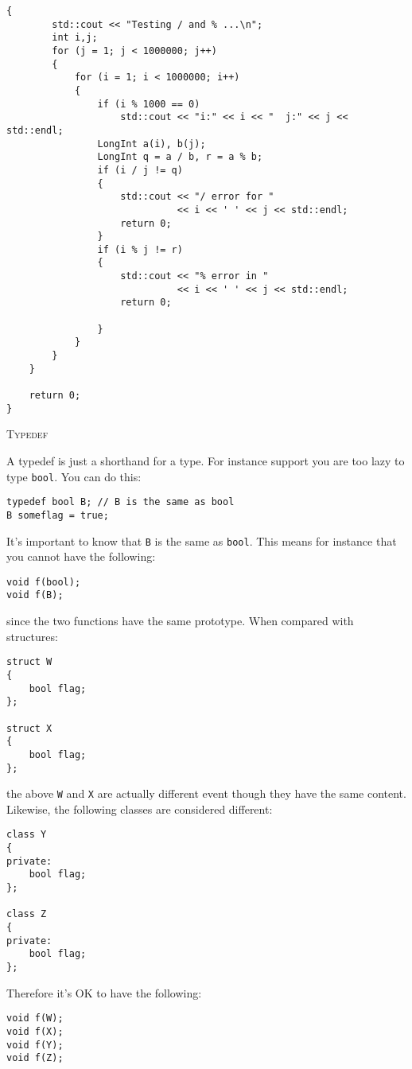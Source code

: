 \begin{Verbatim}[commandchars=\^\@\~, frame=single, fontsize=\footnotesize]
    {
        std::cout << "Testing / and % ...\n";
        int i,j;
        for (j = 1; j < 1000000; j++)
        {
            for (i = 1; i < 1000000; i++)
            {
                if (i % 1000 == 0)
                    std::cout << "i:" << i << "  j:" << j << std::endl;
                LongInt a(i), b(j);
                LongInt q = a / b, r = a % b;
                if (i / j != q)
                {
                    std::cout << "/ error for "
                              << i << ' ' << j << std::endl;
                    return 0;
                }
                if (i % j != r)
                {
                    std::cout << "% error in "
                              << i << ' ' << j << std::endl;
                    return 0;

                }
            }
        }
    }
    
    return 0;
}
\end{Verbatim}

\newpage
\textsc{Typedef}

A typedef is just a shorthand for a type. For instance support you
are too lazy to type \verb!bool!. You can do this:

\begin{Verbatim}[frame=single,fontsize=\footnotesize]
typedef bool B; // B is the same as bool
B someflag = true; 
\end{Verbatim}

It's important to know that \verb!B! is the same as \verb!bool!. This 
means for instance that you cannot have the following:
\begin{Verbatim}[frame=single,fontsize=\footnotesize]
void f(bool);
void f(B);
\end{Verbatim}
since the two functions have the same prototype. When compared with 
structures:
\begin{Verbatim}[frame=single,fontsize=\footnotesize]
struct W 
{
    bool flag;
};

struct X
{
    bool flag;
};
\end{Verbatim}
the above \verb!W! and \verb!X! are actually different event though 
they have the same content. Likewise, the following classes are 
considered different:
\begin{Verbatim}[frame=single,fontsize=\footnotesize]
class Y
{
private:
    bool flag;
};

class Z
{
private:
    bool flag;
};
\end{Verbatim}

Therefore it's OK to have the following:
\begin{Verbatim}[frame=single,fontsize=\footnotesize]
void f(W);
void f(X);
void f(Y);
void f(Z);
\end{Verbatim}

